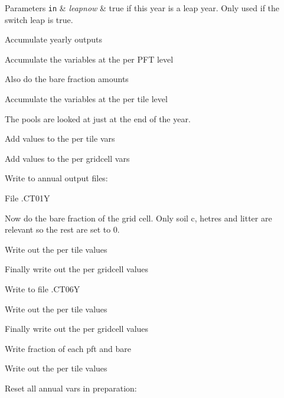 \begin{DoxyParams}[1]{Parameters}
\mbox{\tt in}  & {\em leapnow} & true if this year is a leap year. Only used if the switch \textquotesingle{}leap\textquotesingle{} is true. \\
\hline
\end{DoxyParams}




Accumulate yearly outputs

Accumulate the variables at the per P\+F\+T level

Also do the bare fraction amounts

Accumulate the variables at the per tile level

The pools are looked at just at the end of the year.

Add values to the per tile vars

Add values to the per gridcell vars

Write to annual output files\+:

File .C\+T01\+Y

Now do the bare fraction of the grid cell. Only soil c, hetres and litter are relevant so the rest are set to 0.

Write out the per tile values

Finally write out the per gridcell values

Write to file .C\+T06\+Y

Write out the per tile values

Finally write out the per gridcell values

Write fraction of each pft and bare

Write out the per tile values

Reset all annual vars in preparation\+: 